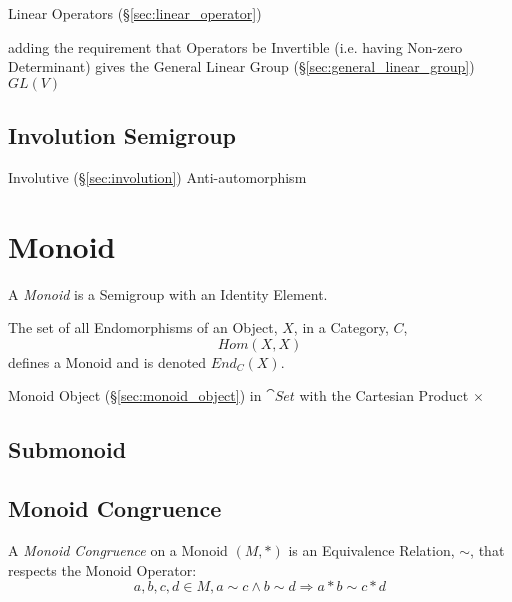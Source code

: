 Linear Operators (\S\ref{sec:linear_operator})

adding the requirement that Operators be Invertible (i.e. having Non-zero
Determinant) gives the General Linear Group (\S\ref{sec:general_linear_group})
$GL(V)$



\subsection{Involution Semigroup}\label{sec:involution_semigroup}

Involutive (\S\ref{sec:involution}) Anti-automorphism



\section{Monoid}\label{sec:monoid}

A \emph{Monoid} is a Semigroup with an Identity Element.

The set of all Endomorphisms of an Object, $X$, in a Category, $C$,
\[
    Hom(X,X)
\]
defines a Monoid and is denoted $End_C(X)$.

Monoid Object (\S\ref{sec:monoid_object}) in $\cat{Set}$ with the
Cartesian Product $\times$



\subsection{Submonoid}\label{sec:submonoid}

\subsection{Monoid Congruence}\label{sec:monoid_congruence}

A \emph{Monoid Congruence} on a Monoid $(M,*)$ is an Equivalence
Relation, $\sim$, that respects the Monoid Operator:
\[
  a,b,c,d \in M, a \sim c \wedge b \sim d \Rightarrow a*b \sim c*d
\]

